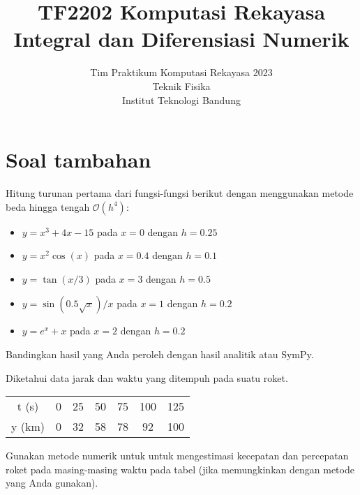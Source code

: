 



\title{%
{\small TF2202 Komputasi Rekayasa}\\
Integral dan Diferensiasi Numerik
}
\author{Tim Praktikum Komputasi Rekayasa 2023\\
Teknik Fisika\\
Institut Teknologi Bandung}
\date{}
\maketitle








\section{Soal tambahan}







\begin{soal}
Hitung turunan pertama dari fungsi-fungsi berikut dengan menggunakan metode beda hingga
tengah $\mathcal{O}(h^4)$:
\begin{itemize}
\item $y = x^3 + 4x - 15$ pada $x=0$ dengan $h=0.25$
\item $y = x^2 \cos(x)$ pada $x=0.4$ dengan $h=0.1$
\item $y = \tan(x/3)$ pada $x=3$ dengan $h=0.5$
\item $y = \sin(0.5\sqrt{x})/x$ pada $x=1$ dengan $h=0.2$
\item $y = e^{x} + x$ pada $x=2$ dengan $h=0.2$
\end{itemize}
Bandingkan hasil yang Anda peroleh dengan hasil analitik atau SymPy.
\end{soal}


\begin{soal}
Diketahui data jarak dan waktu yang ditempuh pada suatu roket.

{\centering
\begin{tabular}{|c|cccccc|}
\hline
t (s)  & 0 & 25 & 50 & 75 & 100 & 125 \\
y (km) & 0 & 32 & 58 & 78 &  92 & 100 \\
\hline
\end{tabular}
\par}

Gunakan metode numerik untuk untuk mengestimasi kecepatan dan percepatan roket
pada masing-masing waktu pada tabel (jika memungkinkan dengan metode yang Anda
gunakan).
\end{soal}





